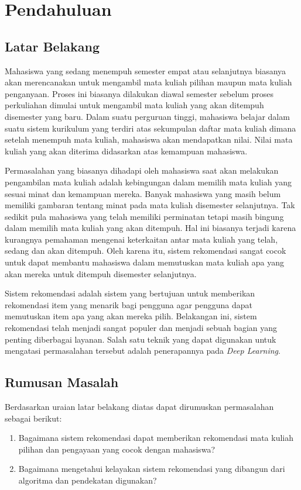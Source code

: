 \chapter{Pendahuluan}

\section{Latar Belakang}

Mahasiswa yang sedang menempuh semester empat atau selanjutnya biasanya akan merencanakan untuk mengambil
mata kuliah pilihan maupun mata kuliah penganyaan. Proses ini biasanya dilakukan diawal semester sebelum proses perkuliahan
dimulai untuk mengambil mata kuliah yang akan ditempuh disemester yang baru. Dalam suatu perguruan tinggi, mahasiswa belajar dalam suatu
sistem kurikulum yang terdiri atas sekumpulan daftar mata kuliah dimana setelah menempuh mata kuliah,
mahasiswa akan mendapatkan nilai. Nilai mata kuliah yang akan diterima didasarkan atas kemampuan
mahasiswa.

Permasalahan yang biasanya dihadapi oleh mahasiswa saat akan melakukan pengambilan mata kuliah adalah kebingungan dalam
memilih mata kuliah yang sesuai minat dan kemampuan mereka. Banyak mahasiswa yang masih belum memiliki gambaran tentang
minat pada mata kuliah disemester selanjutnya. Tak sedikit pula mahasiswa yang telah memiliki perminatan tetapi masih
bingung dalam memilih mata kuliah yang akan ditempuh. Hal ini biasanya terjadi karena kurangnya pemahaman mengenai
keterkaitan antar mata kuliah yang telah, sedang dan akan ditempuh. Oleh karena itu, sistem rekomendasi sangat cocok untuk
dapat membantu mahasiswa dalam memutuskan mata kuliah apa yang akan mereka untuk ditempuh disemester selanjutnya.

Sistem rekomendasi adalah sistem yang bertujuan untuk memberikan rekomendasi item yang menarik bagi pengguna agar pengguna
dapat memutuskan item apa yang akan mereka pilih. Belakangan ini, sistem rekomendasi telah menjadi sangat populer dan menjadi
sebuah bagian yang penting diberbagai layanan. Salah satu teknik yang dapat digunakan untuk mengatasi permasalahan tersebut adalah
penerapannya pada \emph{Deep Learning}.

\section{Rumusan Masalah}
Berdasarkan uraian latar belakang diatas dapat dirumuskan permasalahan sebagai berikut:
\begin{enumerate}[noitemsep]
      \item Bagaimana sistem rekomendasi dapat memberikan rekomendasi mata kuliah pilihan dan pengayaan
            yang cocok dengan mahasiswa?
      \item Bagaimana mengetahui kelayakan sistem rekomendasi yang dibangun dari algoritma dan pendekatan
            digunakan?
\end{enumerate}


